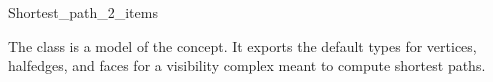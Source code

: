 
\ccRefPageBegin


\begin{ccRefClass}{Shortest_path_2_items}

\ccDefinition
  
The class \ccRefName{} is a model of the 
concept. It exports the default types for vertices, halfedges, and faces
for a visibility complex meant to compute shortest paths.


\ccIsModel
{}

\ccSeeAlso

\\

\end{ccRefClass}
\ccRefPageEnd
